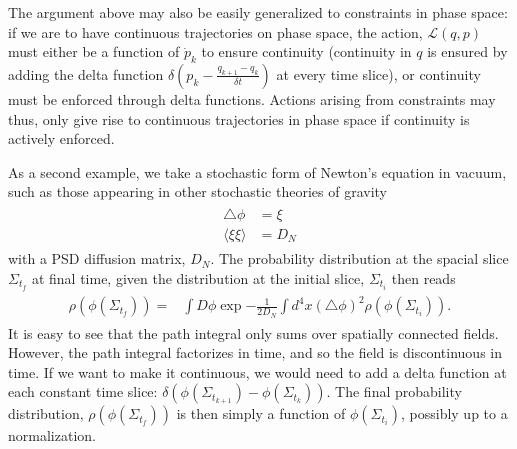\documentclass[aps,preprintnumbers,superscriptaddress,longbibliography]{revtex4-1}
\begin{document}
The argument above may also be easily generalized to constraints in phase space: if we are to have continuous trajectories on phase space, the action, $\mathcal{L}(q,p)$ must either be a function of $\dot{p}_k$ to ensure continuity (continuity in $q$ is ensured by adding the delta function $\delta(p_k-\frac{q_{k+1}-q_{k}}{\delta t})$ at every time slice), or continuity must be enforced through delta functions. Actions arising from constraints may thus, only give rise to continuous trajectories in phase space if continuity is actively enforced. 

As a second example, we take a stochastic form of Newton's equation in vacuum, such as those appearing in other stochastic theories of gravity\cite{hu2008stochastic,moffat1997stochastic,tilloy2016sourcing} 
\begin{align}
\begin{split}
\triangle\phi&=\xi\\\langle\xi\xi\rangle&=D_N
\end{split}
\end{align}
with a PSD diffusion matrix, $D_N$. The probability distribution at the spacial slice $\Sigma_{t_f}$ at final time, given the distribution at the initial slice, $\Sigma_{t_i}$ then reads \begin{align}
\begin{split}
    \rho(\phi(\Sigma_{t_f}))=&\int D\phi\exp{-\frac{1}{2D_N}\int d^4x (\triangle\phi)^2} \rho(\phi(\Sigma_{t_i})).
\end{split}
\end{align}
It is easy to see that the path integral only sums over spatially connected fields. However, the path integral factorizes in time, and so the field is discontinuous in time. If we want to make it continuous, we would need to add a delta function at each constant time slice: $\delta(\phi(\Sigma_{t_{k+1}})-\phi(\Sigma_{t_{k}}))$. The final probability distribution, $\rho(\phi(\Sigma_{t_f}))$ is then simply a function of $\phi(\Sigma_{t_{i}})$, possibly up to a normalization.  
%

\end{document}
